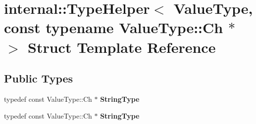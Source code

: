 \hypertarget{structinternal_1_1_type_helper_3_01_value_type_00_01const_01typename_01_value_type_1_1_ch_01_5_01_4}{}\section{internal\+:\+:Type\+Helper$<$ Value\+Type, const typename Value\+Type\+:\+:Ch $\ast$ $>$ Struct Template Reference}
\label{structinternal_1_1_type_helper_3_01_value_type_00_01const_01typename_01_value_type_1_1_ch_01_5_01_4}
\subsection*{Public Types}
\begin{DoxyCompactItemize}
\item 
typedef const Value\+Type\+::\+Ch $\ast$ {\bfseries String\+Type}\hypertarget{structinternal_1_1_type_helper_3_01_value_type_00_01const_01typename_01_value_type_1_1_ch_01_5_01_4_a61b7fd9c92eab60394fdff466251c399}{}\label{structinternal_1_1_type_helper_3_01_value_type_00_01const_01typename_01_value_type_1_1_ch_01_5_01_4_a61b7fd9c92eab60394fdff466251c399}

\item 
typedef const Value\+Type\+::\+Ch $\ast$ {\bfseries String\+Type}\hypertarget{structinternal_1_1_type_helper_3_01_value_type_00_01const_01typename_01_value_type_1_1_ch_01_5_01_4_a61b7fd9c92eab60394fdff466251c399}{}\label{structinternal_1_1_type_helper_3_01_value_type_00_01const_01typename_01_value_type_1_1_ch_01_5_01_4_a61b7fd9c92eab60394fdff466251c399}

\end{DoxyCompactItemize}
